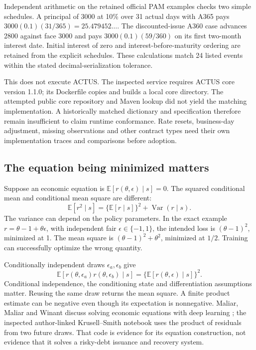 \documentclass[11pt,a4paper]{article}
\newcommand{\E}{\mathbb E}
\begin{document}
Independent arithmetic on the retained official PAM examples checks two
simple schedules. A principal of 3000 at 10\% over 31 actual days with A365
pays $3000(0.1)(31/365)=25.479452\ldots$. The discounted-issue A360 case
advances 2800 against face 3000 and pays $3000(0.1)(59/360)$ on its first
two-month interest date. Initial interest of zero and interest-before-maturity
ordering are retained from the explicit schedules. These calculations match
24 listed events within the stated decimal-serialization tolerance.

This does not execute ACTUS. The inspected service requires ACTUS core version 1.1.0;
its Dockerfile copies and builds a local
core directory. The attempted public core repository and Maven lookup did
not yield the matching implementation. A historically matched dictionary and
specification therefore remain insufficient to claim runtime conformance.
Rate resets, business-day adjustment, missing observations and other contract
types need their own implementation traces and comparisons before adoption.

\subsection{The equation being minimized matters}
Suppose an economic equation is $\E[r(\theta,\epsilon)\mid s]=0$. The
squared conditional mean and conditional mean square are different:
\begin{equation}
\E[r^2\mid s]=\{\E[r\mid s]\}^2+\operatorname{Var}(r\mid s).
\end{equation}
The variance can depend on the policy parameters. In the exact example
$r=\theta-1+\theta\epsilon$, with independent fair $\epsilon\in\{-1,1\}$,
the intended loss is $(\theta-1)^2$, minimized at 1. The mean square is
$(\theta-1)^2+\theta^2$, minimized at $1/2$. Training can successfully
optimize the wrong quantity.

Conditionally independent draws $\epsilon_a,\epsilon_b$ give
\begin{equation}
\E[r(\theta,\epsilon_a)r(\theta,\epsilon_b)\mid s]
=\{\E[r(\theta,\epsilon)\mid s]\}^2.
\end{equation}
Conditional independence, the conditioning state and differentiation
assumptions matter. Reusing the same draw returns the mean square. A finite
product estimate can be negative even though its expectation is nonnegative.
Maliar, Maliar and Winant discuss solving economic equations with deep
learning \cite{maliar}; the inspected author-linked Krusell--Smith notebook
uses the product of residuals from two future draws. That code is evidence
for its equation construction, not evidence that it solves a risky-debt
issuance and recovery system.
\end{document}
